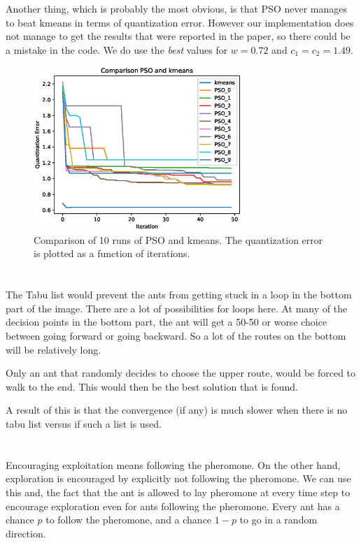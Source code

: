 \documentclass[11pt]{article}
\begin{document}
Another thing, which is probably the most obvious, is that PSO never manages to beat kmeans in terms of quantization error. However our implementation does not manage to get the results that were reported in the paper, so there could be a mistake in the code. We do use the \textit{best} values for $w = 0.72$ and $c_1 = c_2 = 1.49$.

\begin{figure}[H]
	\centering
	\includegraphics[width=0.7\textwidth]{images/pso_kmeans.eps}
	\caption{Comparison of 10 runs of PSO and kmeans. The quantization error is plotted as a function of iterations.}
	\label{fig:pso_kmeans}
\end{figure}

\section{}

The Tabu list  would prevent the ants from getting stuck in a loop in the bottom part of the image. There are a lot of possibilities for loops here. At many of the decision points in the bottom part, the ant will get a 50-50 or worse choice between going forward or going backward. So a lot of the routes on the bottom will be relatively long.

Only an ant that randomly decides to choose the upper route, would be forced to walk to the end. This would then be the best solution that is found. 

A result of this is that the convergence (if any) is much slower when there is no tabu list versus if such a list is used.

\section{}
Encouraging exploitation means following the pheromone. On the other hand, exploration is encouraged by explicitly not following the pheromone. We can use this and, the fact that the ant is allowed to lay pheromone at every time step to encourage exploration even for ants following the pheromone. Every ant has a chance $p$ to follow the pheromone, and a chance $1 - p$ to go in a random direction. 
\end{document}
